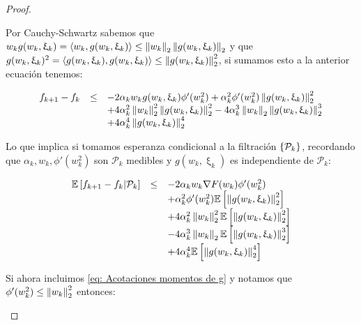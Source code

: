 \begin{proof}
\begin{enumerate}
		Por Cauchy-Schwartz sabemos que $w_k g(w_k, \upxi_{k}) = \left\langle w_k, g(w_k, \upxi_{k})\right\rangle \leq \left\lVert w_k\right\rVert_2 \left\lVert g(w_k, \upxi_{k})\right\rVert_2$ y que $g(w_k, \upxi_{k})^2 = \left\langle g(w_k, \upxi_{k}), g(w_k, \upxi_{k})\right\rangle \leq \left\lVert g(w_k, \upxi_{k})\right\rVert_2^2$, si sumamos esto a la anterior ecuaci\'on tenemos:
		
		\begin{equation*}
		\begin{array}{rcl}
		f_{k+1} - f_k & \leq & -2 \alpha_k w_k g(w_k, \upxi_{k}) \phi'(w_k^2)  + \alpha_k^2 \phi'(w_k^2) \left\lVert g(w_k, \upxi_{k})\right\rVert_2^2 \\ 
		& & + 4 \alpha_k^2 \left\lVert w_k\right\rVert_2^2 \left\lVert g(w_k, \upxi_{k})\right\rVert_2^2 -4 \alpha_k^3 \left\lVert w_k\right\rVert_2 \left\lVert g(w_k, \upxi_{k})\right\rVert_2^3  \\
		& & + 4 \alpha_k^4 \left\lVert g(w_k, \upxi_{k})\right\rVert_2^4 \\
		\end{array}
		\end{equation*}
		
		Lo que implica si tomamos esperanza condicional a la filtraci\'on $\left\lbrace\mathcal{P}_k\right\rbrace$, recordando que $\alpha_k, w_k, \phi'(w_k^2)$ son $\mathcal{P}_k$ medibles y $g(w_k, \upxi_{k})$ es independiente de $\mathcal{P}_k$:
		
		\begin{equation*}
		\begin{array}{rcl}
		\mathbb{E} \left[{f_{k+1} - f_k} \vert \mathcal{P}_{k}\right] & \leq & -2 \alpha_k w_k \nabla F (w_k)\phi'(w_k^2) \\ 
		&& + \alpha_k^2 \phi'(w_k^2) \mathbb{E} \left[\left\lVert g(w_k, \upxi_{k})\right\rVert_2^2\right] \\ 
		& & + 4 \alpha_k^2 \left\lVert w_k\right\rVert_2^2 \mathbb{E} \left[\left\lVert g(w_k, \upxi_{k})\right\rVert_2^2\right] \\
		& & -4 \alpha_k^3 \left\lVert w_k\right\rVert_2 \mathbb{E} \left[\left\lVert g(w_k, \upxi_{k})\right\rVert_2^3\right]  \\
		& & + 4 \alpha_k^4 \mathbb{E} \left[\left\lVert g(w_k, \upxi_{k})\right\rVert_2^4\right] \\
		\end{array}
		\end{equation*}
		
		Si ahora incluimos \ref{eq: Acotaciones momentos de g} y notamos que $\phi'(w_k^2) \leq \left\lVert w_k\right\rVert_2^2$ entonces:
		

\end{enumerate}
\end{proof}

